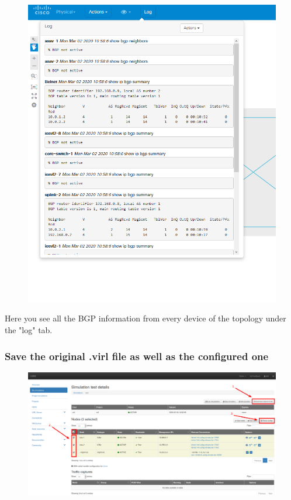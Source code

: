 \documentclass{article}
\begin{document}
\begin{figure}[H]
	\centering
	\includegraphics[width=\textwidth]{images/bgp_log.png}
\end{figure}

Here you see all the BGP information from every device of the topology under the "log" tab.

\subsubsection{Save the original .virl file as well as the configured one}
\begin{figure}[H]
	\centering
	\includegraphics[width=\textwidth]{images/Save_virl.png}
\end{figure}
\end{document}
